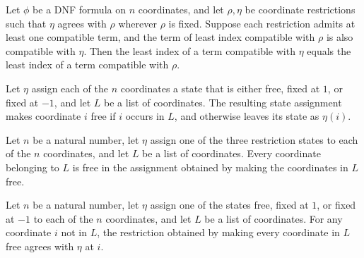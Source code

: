 \begin{theorem}
\label{FABL.DNFFormula.canonicalTermIndex_eq_of_extends}
\leanok
{}
Let $\phi$ be a DNF formula on $n$ coordinates, and let $\rho,\eta$ be coordinate
restrictions such that $\eta$ agrees with $\rho$ wherever $\rho$ is fixed. Suppose each
restriction admits at least one compatible term, and the term of least index compatible
with $\rho$ is also compatible with $\eta$. Then the least index of a term compatible
with $\eta$ equals the least index of a term compatible with $\rho$.
\end{theorem}

\begin{definition}
\label{FABL.CoordRestriction.freeCoordinateList}
\leanok
{}
Let $\eta$ assign each of the $n$ coordinates a state that is either free, fixed at $1$,
or fixed at $-1$, and let $L$ be a list of coordinates. The resulting state assignment
makes coordinate $i$ free if $i$ occurs in $L$, and otherwise leaves its state as
$\eta(i)$.
\end{definition}

\begin{theorem}
\label{FABL.CoordRestriction.freeCoordinateList_apply_of_mem}
\leanok
{}
Let $n$ be a natural number, let $\eta$ assign one of the three restriction states to
each of the $n$ coordinates, and let $L$ be a list of coordinates. Every coordinate
belonging to $L$ is free in the assignment obtained by making the coordinates in $L$
free.
\end{theorem}

\begin{theorem}
\label{FABL.CoordRestriction.freeCoordinateList_apply_of_not_mem}
\leanok
{}
Let $n$ be a natural number, let $\eta$ assign one of the states free, fixed at $1$, or
fixed at $-1$ to each of the $n$ coordinates, and let $L$ be a list of coordinates. For
any coordinate $i$ not in $L$, the restriction obtained by making every coordinate in
$L$ free agrees with $\eta$ at $i$.
\end{theorem}

